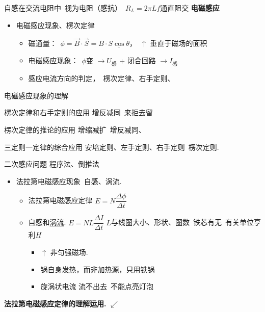 \noindent 自感在交流电阻中\ 视为电阻（感抗）\ $R_L=2\pi Lf$\quad 通直阻交%
\textbf{电磁感应}

\begin{itemize}
\item 电磁感应现象、楞次定律
 \begin{itemize}
 \item 磁通量：\ $\phi=\vec B\cdot\vec S=B\cdot\underline{S\cos\theta}$，\ $\uparrow$ 垂直于磁场的面积
 \item 电磁感应现象：\ $\phi$变 $\to U_{\text{感}}$ + 闭合回路 $\to I_{\text{感}}$
 \item 感应电流方向的判定，\ 楞次定律、右手定则、
 \end{itemize}
\end{itemize}

电磁感应现象的理解

楞次定律和右手定则的应用 \quad 增反减同\ 来拒去留

楞次定律的推论的应用 \quad 增缩减扩\ 增反减同、

三定则一定律的综合应用 \quad 安培定则、左手定则、右手定则\ 楞次定则.

二次感应问题 \quad 程序法、倒推法
\begin{itemize}
\item 法拉第电磁感应现象\ 自感、涡流.
 \begin{itemize}
 \item 法拉第电磁感应定律 \quad $E=N\dfrac{\Delta\phi}{\Delta t}$
 \item 自感和\underline{涡流}. \quad $E=NL\dfrac{\Delta I}{\Delta t}$ \quad $L$与线圈大小、形状、圈数\ 铁芯有无\ 有关\quad 单位亨利$H$
 \begin{itemize}
 \item $\uparrow$ 非匀强磁场.
 \item 锅自身发热，而非加热源，只用铁锅
 \item 旋涡状电流 流不出去\ 不能点亮灯泡
 \end{itemize}
 \end{itemize}
\end{itemize}
\textbf{法拉第电磁感应定律的理解运用.} $\swarrow$

